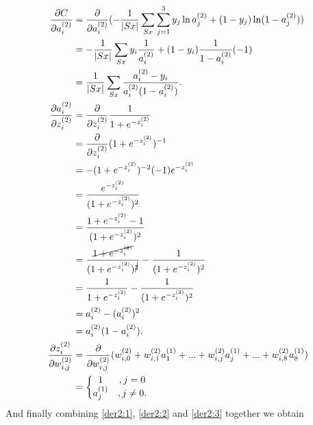 \documentclass[a4paper,12pt,notitlepage]{article}
\begin{document}
\begin{subequations}
\begin{align}
 \frac{\partial C}{\partial a_{i}^{(2)}} 
 &  = \frac{\partial }{\partial a_{i}^{(2)}}(-\frac{1}{|Sx|}\sum_{Sx}\sum_{j=1}^{3}y_{j}\ln a_{j}^{(2)} + (1-y_{j})\ln (1-a_{j}^{(2)})) \notag \\
 & = -\frac{1}{|Sx|}\sum_{Sx}y_{i}\frac{1}{a_{i}^{(2)}}+(1-y_{i})\frac{1}{1-a_{i}^{(2)}}(-1) \notag \\
 & =\frac{1}{|Sx|}\sum_{Sx}\frac{a_{i}^{(2)}-y_{i}}{a_{i}^{(2)}(1-a_{i}^{(2)})}. \label{der2:1}\\
\frac{\partial a_{i}^{(2)}}{\partial z_{i}^{(2)}}
&= \frac{\partial }{\partial z_{i}^{(2)}}\frac{1}{1+e^{-z_{i}^{(2)}}} \notag\\
&=\frac{\partial }{\partial z_{i}^{(2)}}(1+e^{-z_{i}^{(2)}})^{-1} \notag\\
&=-(1+e^{-z_{i}^{(2)}})^{-2}(-1)e^{-z_{i}^{(2)}} \notag\\
&=\frac{e^{-z_{i}^{(2)}}}{(1+e^{-z_{i}^{(2)}})^{2}} \notag\\
&=\frac{1+e^{-z_{i}^{(2)}}-1}{(1+e^{-z_{i}^{(2)}})^{2}} \notag\\
&=\frac{\cancel{1+e^{-z_{i}^{(2)}}}}{(1+e^{-z_{i}^{(2)}})^{\cancel{2}}}-\frac{1}{(1+e^{-z_{i}^{(2)}})^{2}} \notag\\
&=\frac{1}{1+e^{-z_{i}^{(2)}}}-\frac{1}{(1+e^{-z_{i}^{(2)}})^{2}} \notag\\
&=a_{i}^{(2)}-(a_{i}^{(2)})^{2} \notag\\
&=a_{i}^{(2)}(1-a_{i}^{(2)}). \label{der2:2}\\
\frac{\partial z_{i}^{(2)}}{\partial w_{i,j}^{(2)}}
&=\frac{\partial }{\partial w_{i,j}^{(2)}}(w_{i,0}^{(2)}+w_{i,1}^{(2)}a_{1}^{(1)}+...+w_{i,j}^{(2)}a_{j}^{(1)}+...+w_{i,8}^{(2)}a_{8}^{(1)}) \notag\\
&=\left\{\begin{matrix} 1&, j=0\\ a_{j}^{(1)}&, j\neq 0. \end{matrix}\right. \label{der2:3}
\end{align}
\end{subequations}
And finally combining \eqref{der2:1}, \eqref{der2:2} and \eqref{der2:3} together we obtain
\end{document}

